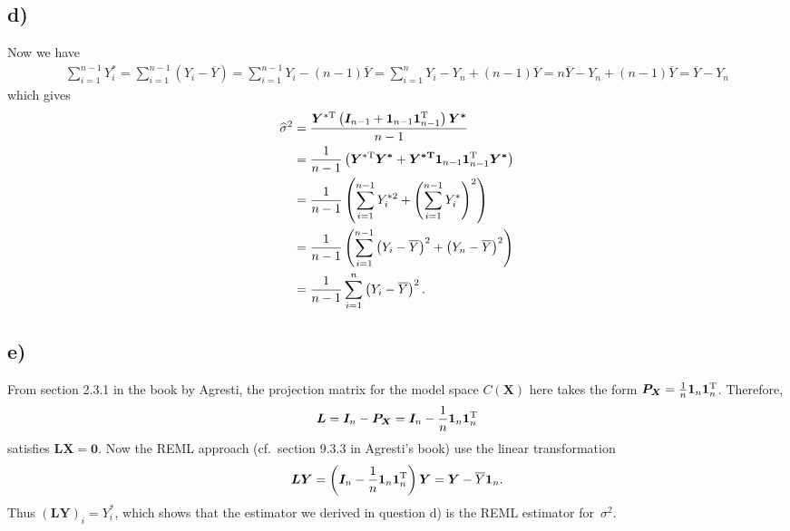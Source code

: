 \documentclass[a4paper]{article}
\begin{document}
\vspace{\baselineskip}
\subsection{d)}
Now we have
\begin{align*}
\sum_{i=1}^{n-1}Y_{i}^{*} = \sum_{i=1}^{n-1}\left(Y_{i}-\overline{Y}\right) = \sum_{i=1}^{n-1}Y_{i} -(n-1)\overline{Y} = \sum_{i=1}^{n}Y_{i} -Y_{n} +(n-1)\overline{Y} = n\overline{Y} -Y_{n} +(n-1)\overline{Y} = \overline{Y}-Y_{n}
\end{align*}
which gives
\begin{align*}
\widehat{\sigma}^{2} &= \frac{\bm{Y}^{*{\rm T}}\left(\bm{I}_{n-1} + \bm{1}_{n-1}\bm{1}_{n-1}^{\rm T}\right)\bm{Y^{*}}}{n-1}\\
&= \frac{1}{n-1}\left(\bm{Y}^{*{\rm T}}\bm{Y^{*}} + \bm{Y^{*{\rm T}}}\bm{1}_{n-1}\bm{1}_{n-1}^{\rm T}\bm{Y^{*}}\right)\\
&= \frac{1}{n-1}\left(\sum_{i=1}^{n-1}Y_{i}^{*2} + \left(\sum_{i=1}^{n-1}Y_{i}^{*}\right)^{2}\right)\\
&= \frac{1}{n-1}\left(\sum_{i=1}^{n-1}\left(Y_{i}-\overline{Y}\right)^{2} + \left(Y_{n}-\overline{Y}\right)^{2}\right)\\
&= \frac{1}{n-1}\sum_{i=1}^{n}\left(Y_{i}-\overline{Y}\right)^{2}.
\end{align*}



\vspace{\baselineskip}
\subsection{e)}
From section 2.3.1 in the book by Agresti, the projection matrix for the model space $C(\bm{X})$ here takes the form 
$\bm{P_X}=\tfrac{1}{n}\bm{1}_{n}\bm{1}_{n}^{\rm T}$. Therefore,
\begin{align*}
\bm{L}=\bm{I}_n-\bm{P_X}=\bm{I}_n-\frac{1}{n}\bm{1}_{n}\bm{1}_{n}^{\rm T}
\end{align*}
satisfies $\bm{L}\bm{X}=\bm{0}$. Now the REML approach (cf.\ section 9.3.3 in Agresti's book) use the linear transformation
\begin{align*}
\bm{L}\bm{Y}=\left(\bm{I}_n-\frac{1}{n}\bm{1}_{n}\bm{1}_{n}^{\rm T}\right)\bm{Y}=\bm{Y}-\overline{Y}\bm{1}_{n}.
\end{align*}
Thus $(\bm{L}\bm{Y})_{i}=Y_{i}^{*}$, which shows that the estimator we derived in question d) is the REML estimator for~$\sigma^{2}$.



%
%
\end{document}
